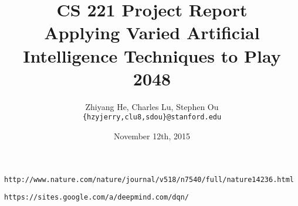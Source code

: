 \documentclass[11pt]{article}
\title{CS 221 Project Report \\ Applying Varied Artificial Intelligence Techniques to Play 2048}
\author{Zhiyang He, Charles Lu, Stephen Ou \\ \texttt{\{hzyjerry,clu8,sdou\}@stanford.edu}}
\date{November 12th, 2015}
\begin{document}
\maketitle

\begin{thebibliography}{9}

 \texttt{http://www.nature.com/nature/journal/v518/n7540/full/nature14236.html}

 \texttt{https://sites.google.com/a/deepmind.com/dqn/}

\end{thebibliography}
\end{document}
